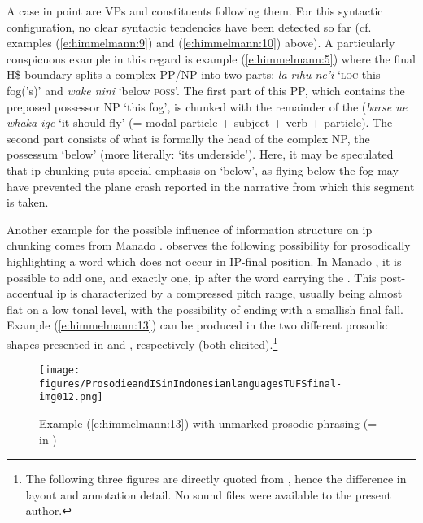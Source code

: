 \documentclass[output=paper
,modfonts
,nonflat]{langsci/langscibook}
\begin{document}
A case in point are VPs and constituents following them. For this syntactic configuration, no clear syntactic tendencies have been detected so far (cf. examples (\ref{e:himmelmann:9}) and (\ref{e:himmelmann:10}) above). A particularly conspicuous example in this regard is example (\ref{e:himmelmann:5}) where the final H\$-boundary splits a complex PP/NP into two parts: \textit{la rihu ne'i} ‘\textsc{loc} this fog('s)’ and \textit{wake nini} ‘below \textsc{poss’.} The first part of this PP, which contains the preposed possessor NP ‘this fog’, is chunked with the remainder of the  (\textit{barse ne whaka ige} ‘it should fly’ (= modal particle + subject  + verb + particle). The second part consists of what is formally the head of the complex NP, the possessum ‘below’ (more literally: ‘its underside’). Here, it may be speculated that ip chunking puts special emphasis on ‘below’, as flying below the fog may have prevented the plane crash reported in the narrative from which this segment is taken.

Another example for the possible influence of information structure on ip chunking comes from Manado . \citet{Stoel2007} observes the following possibility for prosodically highlighting a word which does not occur in IP-final position. In Manado , it is possible to add one, and exactly one, ip after the word carrying the . This post-accentual ip is characterized by a compressed pitch range, usually being almost flat on a low tonal level, with the possibility of ending with a smallish final fall. Example (\ref{e:himmelmann:13}) can be produced in the two different prosodic shapes presented in  and , respectively (both elicited).\footnote{The following three figures are directly quoted from \citet{Stoel2007}, hence the difference in layout and annotation detail. No sound files were available to the present author.}


\begin{figure}
	\texttt{[image: figures/ProsodieandISinIndonesianlanguagesTUFSfinal-img012.png]}
	\caption{Example (\ref{e:himmelmann:13}) with unmarked prosodic phrasing (=  in \citealt[126]{Stoel2007})}
	\label{f17}
\end{figure}
\end{document}
